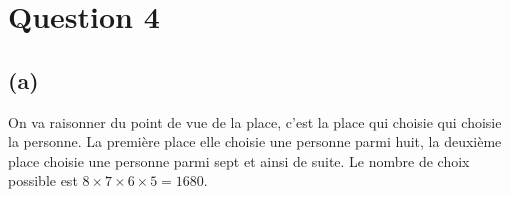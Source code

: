 \section*{Question 4}
\subsection*{(a)}
On va raisonner du point de vue de la place, c’est la place qui choisie qui choisie la personne. La première place elle choisie une personne parmi huit, la deuxième place choisie une personne parmi sept et ainsi de suite. Le nombre de choix possible est $ 8 \times 7 \times 6 \times 5 = 1680$.